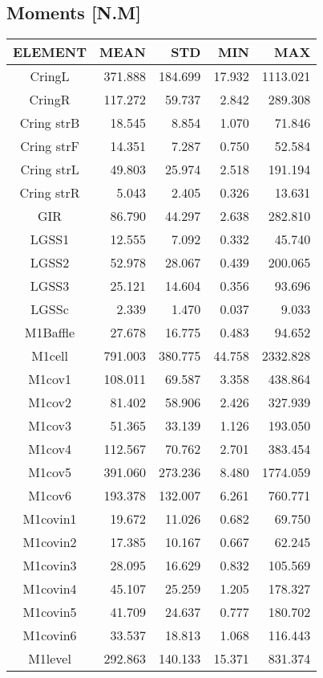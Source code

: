 \subsection{Moments [N.M]}
\begin{longtable}{crrrr}\toprule
 ELEMENT & MEAN & STD & MIN & MAX \\\hline
 CringL & 371.888 & 184.699 & 17.932 & 1113.021 \\
 CringR & 117.272 & 59.737 & 2.842 & 289.308 \\
 Cring strB & 18.545 & 8.854 & 1.070 & 71.846 \\
 Cring strF & 14.351 & 7.287 & 0.750 & 52.584 \\
 Cring strL & 49.803 & 25.974 & 2.518 & 191.194 \\
 Cring strR & 5.043 & 2.405 & 0.326 & 13.631 \\
 GIR & 86.790 & 44.297 & 2.638 & 282.810 \\
 LGSS1 & 12.555 & 7.092 & 0.332 & 45.740 \\
 LGSS2 & 52.978 & 28.067 & 0.439 & 200.065 \\
 LGSS3 & 25.121 & 14.604 & 0.356 & 93.696 \\
 LGSSc & 2.339 & 1.470 & 0.037 & 9.033 \\
 M1Baffle & 27.678 & 16.775 & 0.483 & 94.652 \\
 M1cell & 791.003 & 380.775 & 44.758 & 2332.828 \\
 M1cov1 & 108.011 & 69.587 & 3.358 & 438.864 \\
 M1cov2 & 81.402 & 58.906 & 2.426 & 327.939 \\
 M1cov3 & 51.365 & 33.139 & 1.126 & 193.050 \\
 M1cov4 & 112.567 & 70.762 & 2.701 & 383.454 \\
 M1cov5 & 391.060 & 273.236 & 8.480 & 1774.059 \\
 M1cov6 & 193.378 & 132.007 & 6.261 & 760.771 \\
 M1covin1 & 19.672 & 11.026 & 0.682 & 69.750 \\
 M1covin2 & 17.385 & 10.167 & 0.667 & 62.245 \\
 M1covin3 & 28.095 & 16.629 & 0.832 & 105.569 \\
 M1covin4 & 45.107 & 25.259 & 1.205 & 178.327 \\
 M1covin5 & 41.709 & 24.637 & 0.777 & 180.702 \\
 M1covin6 & 33.537 & 18.813 & 1.068 & 116.443 \\
 M1level & 292.863 & 140.133 & 15.371 & 831.374 \\

\end{longtable}
